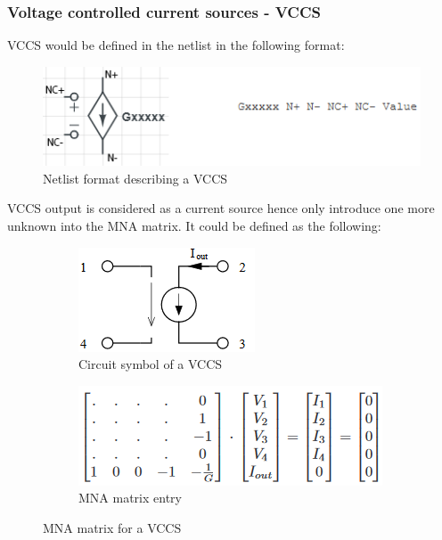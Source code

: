 \documentclass[12pt,a4paper]{article}
\begin{document}
\subsubsection{Voltage controlled current sources - VCCS}
VCCS would be  defined in the netlist in the following format: \par 
\begin{figure} [h!]
	\centering
	\includegraphics[]{G.png}
	\caption{Netlist format describing a VCCS \cite{MNA}}
\end{figure}
VCCS output is considered as a current source hence only introduce one more unknown into the MNA matrix. 
It could be defined as the following:
\begin{figure} [h!]
	\centering
	\begin{subfigure}{.5\textwidth}
	  \centering
	  \includegraphics[scale=0.8]{G_diagram.PNG}
	  \caption{Circuit symbol of a VCCS}
	  \label{fig:sub1}
	\end{subfigure}%
	\begin{subfigure}{.5\textwidth}
	  \centering
	  \includegraphics[width= \textwidth]{G_matrices.PNG}
	  \caption{MNA matrix entry}
	  \label{fig:sub2}
	\end{subfigure}
	\caption{MNA matrix for a VCCS \cite{jahn_margraf_habchi_jacob_2003}}
	\label{fig:test}
\end{figure} \pagebreak
\end{document}
